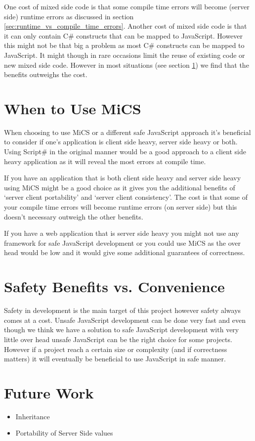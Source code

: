 	One cost of mixed side code is that some compile time errors will become (server side) runtime errors as discussed in section \ref{sec:runtime_vs_compile_time_errors}. Another cost of mixed side code is that it can only contain C\# constructs that can be mapped to JavaScript. However this might not be that big a problem as most C\# constructs can be mapped to JavaScript. It might though in rare occasions limit the reuse of existing code or new mixed side code. However in most situations (see section \ref{sec:when_to_use_mics}) we find that the benefits outweighs the cost.


\section{When to Use MiCS} %
\label{sec:when_to_use_mics}
	When choosing to use MiCS or a different safe JavaScript approach it’s beneficial to consider if one’s application is client side heavy, server side heavy or both. Using Script\# in the original manner would be a good approach to a client side heavy application as it will reveal the most errors at compile time. 

	If you have an application that is both client side heavy and server side heavy using MiCS might be a good choice as it gives you the additional benefits of ‘server client portability’ and ‘server client consistency’. The cost is that some of your compile time errors will become runtime errors (on server side) but this doesn’t necessary outweigh the other benefits. 

	If you have a web application that is server side heavy you might not use any framework for safe JavaScript development or you could use MiCS as the over head would be low and it would give some additional guarantees of correctness.



\section{Safety Benefits vs. Convenience} %
\label{sec:safety_benefits_vs_conveniente}
	Safety in development is the main target of this project however safety always comes at a cost. Unsafe JavaScript development can be done very fast and even though we think we have a solution to safe JavaScript development with very little over head unsafe JavaScript can be the right choice for some projects. However if a project reach a certain size or complexity (and if correctness matters) it will eventually be beneficial to use JavaScript in safe manner.

\section{Future Work}
\begin{itemize}
	\item Inheritance
	\item Portability of Server Side values
\end{itemize}